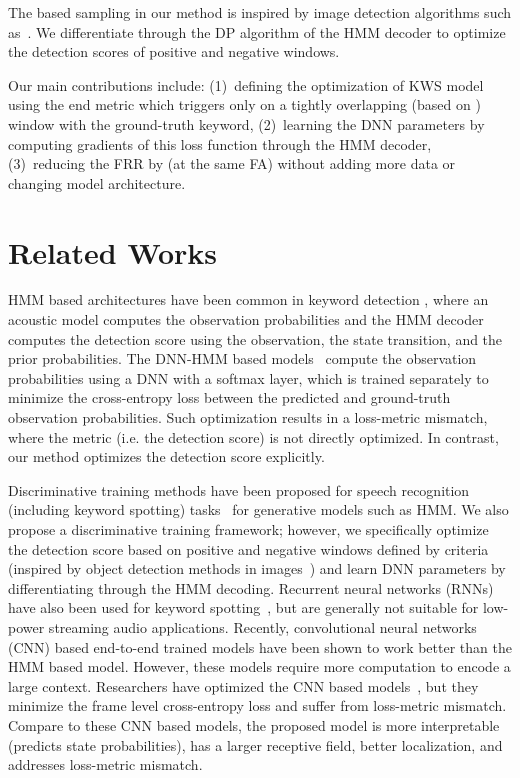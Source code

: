 \documentclass{article}
\begin{document}
The  based sampling in our method is inspired by image detection algorithms such as~\cite{yoloRedmon2016, yolo3Redmon2017, FasterRcnn2015}.
We differentiate through the DP algorithm of the  HMM decoder to optimize the detection scores of positive and negative windows.

Our main contributions include: (1)~defining the optimization of KWS model using the end metric which triggers only on a tightly overlapping (based on ) window with the ground-truth keyword,
(2)~learning the DNN parameters by computing gradients of this loss function through the HMM decoder, (3)~reducing the FRR by  (at the same FA) without adding more data or changing model architecture.
 \section{Related Works}
HMM based architectures have been common in keyword detection \cite{mi_hmm_Bahl_1986, rohlichek1989,rose1990,wilpon1990automatic,alphanet_Bridle90}, where an acoustic model
computes the observation probabilities and the HMM decoder computes the detection score using the observation, the state transition, and the prior probabilities.
The DNN-HMM based models~\cite{SigtiaHRMB18,google2014,Chen2013AHH} compute the observation probabilities using a DNN with a softmax layer, which is trained separately to minimize the cross-entropy loss between the predicted and ground-truth observation probabilities.
Such optimization results in a loss-metric mismatch, where the metric (i.e. the detection score) is not directly optimized.
In contrast, our method optimizes the detection score explicitly.

Discriminative training methods have been proposed for speech recognition (including keyword spotting) tasks~\cite{dis_KWS_keshet_2009,seq_dis_KWS_keshet_2018} for generative models such as HMM.
We also propose a discriminative training framework; however, we specifically optimize the detection score based on positive and negative windows defined by  criteria (inspired by object detection methods in images~\cite{yoloRedmon2016, yolo3Redmon2017, FasterRcnn2015}) and learn DNN parameters by differentiating through the HMM decoding.
Recurrent neural networks (RNNs) have also been used for keyword spotting~\cite{fernandez2007application,woellmer2013keyword,lengerich2016end,hwang2015online,graves2006connectionist}, but are generally not suitable for low-power streaming audio applications.
Recently, convolutional neural networks (CNN) based end-to-end trained models \cite{Zhang2017HelloEK,Tang2018DeepRL,google2015} have been shown to work better than the HMM based model.
However, these models require more computation to encode a large context.
Researchers have optimized the CNN based models~\cite{svdf2018,svdf2015,Sun2017CompressedTD,Higuchi2020}, but they minimize the frame level cross-entropy loss and suffer from loss-metric mismatch.
Compare to these CNN based models, the proposed model is more interpretable (predicts state probabilities), has a larger receptive field, better localization, and addresses loss-metric mismatch.
 
\end{document}
